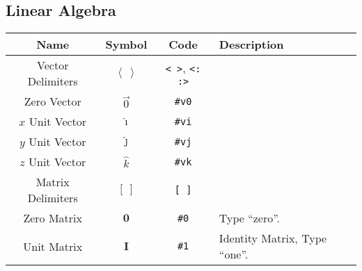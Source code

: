 \documentclass{article}
\begin{document}
  \newpage

  \subsection{Linear Algebra} %
  \label{sub:linearalgebra}
  \begin{table}[!h]
    \centering
    \begin{tabular}{|c|c|c|l|}
      \hline
      \textbf{Name} & \textbf{Symbol} & \textbf{Code} & \textbf{Description} \\
      \hline\hline
      Vector Delimiters & \( \left\langle \ \right\rangle \) & \texttt{< >}, \texttt{<: :>} & \\[2 pt]
      Zero Vector & \( \vec0 \) & \texttt{\#v0} & \\
      \( x \) Unit Vector & \( \hat\imath \) & \texttt{\#vi} & \\
      \( y \) Unit Vector & \( \hat\jmath \) & \texttt{\#vj} & \\
      \( z \) Unit Vector & \( \hat{k} \) & \texttt{\#vk} & \\
      \hline
      Matrix Delimiters & \( \left[ \ \right] \) & \texttt{[ ]} & \\
      Zero Matrix & \( \mathbf{0} \) & \texttt{\#0} & Type ``zero''.\\
      Unit Matrix & \( \mathbf{I} \) & \texttt{\#1} & Identity Matrix, Type ``one''.\\
      \hline
    \end{tabular}
  \end{table}

\end{document}
